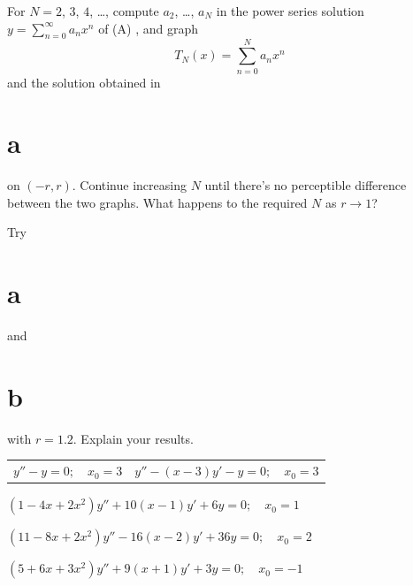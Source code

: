 \begin{exerciselist}
\begin{alist}
    \item %
    For $N=2$, $3$, $4$, \dots, compute $a_{2}$, \dots, $a_{N}$ in the power series solution
    $y=\sum_{n=0}^{\infty}a_{n}x^{n}$ of (A) , and graph
    \[
      T_{N}(x)=\sum_{n=0}^{N}a_{n}x^{n}
    \]
    \enlargethispage{1in}
    and the solution obtained in \part{a} on $(-r,r)$. Continue increasing $N$ until there's no
    perceptible difference between the two graphs. What happens to the required $N$ as $r\to1$?

    \item %
    Try \part{a} and \part{b} with $r=1.2$. Explain your results.
  \end{alist}

  \newpage


  \begin{tabular}[t]{@{}p{120pt}@{}p{130pt}}
    \item\label{exer:7.2.16} $y''-y=0;\quad x_{0}=3$ & \vspace*{5pt} \vspace*{5pt}
    \item\label{exer:7.2.17} $y''-(x-3)y'-y=0;\quad x_{0}=3$
  \end{tabular}

  \item\label{exer:7.2.18} $(1-4x+2x^{2})y''+10(x-1)y'+6y=0;\quad x_{0}=1$

  \item\label{exer:7.2.19} $(11-8x+2x^{2})y''-16(x-2)y'+36y=0;\quad x_{0}=2$

  \item\label{exer:7.2.20} $(5+6x+3x^{2})y''+9(x+1)y'+3y=0;\quad x_{0}=-1$



\end{exerciselist}
